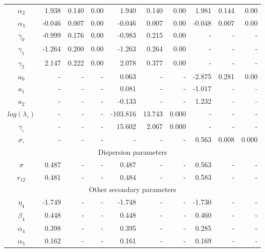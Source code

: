 \begin{table}[ht]
\begin{tabular}{c|rrr|rrr|rrr}
  $\alpha_2$ & 1.938 & 0.140 & 0.00 & 1.940 & 0.140 & 0.00 & 1.981 & 0.144 & 0.00 \\ 
  $\alpha_3$ & -0.046 & 0.007 & 0.00 & -0.046 & 0.007 & 0.00 & -0.048 & 0.007 & 0.00 \\ 
  \hline
  $\gamma_0$ & -0.999 & 0.176 & 0.00 & -0.983 & 0.215 & 0.00 & - & - & - \\ 
  $\gamma_1$ & -1.264 & 0.200 & 0.00 & -1.263 & 0.264 & 0.00 & - & - & - \\ 
  $\gamma_2$ & 2.147 & 0.222 & 0.00 & 2.078 & 0.377 & 0.00 & - & - & - \\
  $a_0$ & - & - & - & 0.063 & - & - & -2.875 & 0.281 & 0.00 \\ 
  $a_1$ & - & - & - & 0.081 & - & - & -1.017 & \textcolor{red}{-} & \textcolor{red}{-} \\ 
  $a_2$ & - & - & - & -0.133 & - & - & 1.232 & \textcolor{red}{-} & \textcolor{red}{-} \\ 
   \hline
   $log(\lambda_{\circ})$ & - & - & - & -103.816 & 13.743 & 0.000  & - & - & -\\
   $\gamma_{\circ}$ & - & - & - & 15.602& 2.067 & 0.000  & -  & - & - \\
   $\sigma_{\circ}$ &  - & - & -  & - & - & - & 0.563 & 0.008 & 0.000 \\
   \hline
   \multicolumn{10}{c}{Dispersion parameters} \\
   \hline
   $\sigma$ & 0.487 & - & - & 0.487 &- &-  & 0.563&- &-  \\
   $r_{12}$ & 0.481 & - & - & 0.484 &- &-  & 0.583 &- &-  \\
   \hline
   \multicolumn{10}{c}{Other secondary parameters} \\
   \hline
   $\eta_4$ & -1.749 & - & - & -1.748 &- &-  & -1.730 &- &-  \\
   $\beta_4$ & 0.448 & - & - & 0.448 &- &-  & 0.460 &- &-  \\
   $\alpha_4$ & 0.398 & - & - & 0.395  &- &-  & 0.285  &- &-  \\
   $\alpha_5$ & 0.162 & - & - & 0.161 &- &-  & 0.169 &- &-  \\
   \hline
\end{tabular}
\label{tbl:applc}
\end{table}


